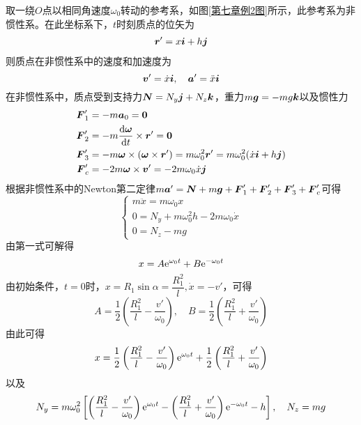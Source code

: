 \begin{solution}
取一绕$O$点以相同角速度$\omega_0$转动的参考系，如图\ref{第七章例2图}所示，此参考系为非惯性系。在此坐标系下，$t$时刻质点的位矢为
\begin{align*}
	\boldsymbol{r}' = x\boldsymbol{i}+h\boldsymbol{j}
\end{align*}
则质点在非惯性系中的速度和加速度为
\begin{equation*}
	\boldsymbol{v}' = \dot{x}\boldsymbol{i},\quad \boldsymbol{a}' = \ddot{x}\boldsymbol{i}
\end{equation*}
在非惯性系中，质点受到支持力$\boldsymbol{N} = N_y\boldsymbol{j}+N_z\boldsymbol{k}$，重力$m\boldsymbol{g}=-mg\boldsymbol{k}$以及惯性力
\begin{align*}
	\boldsymbol{F}'_1 & = -m\boldsymbol{a}_0 = \boldsymbol{0} \\
	\boldsymbol{F}'_2 & = -m\frac{\mathrm{d}\boldsymbol{\omega}}{\mathrm{d} t} \times \boldsymbol{r}' = \boldsymbol{0} \\
	\boldsymbol{F}'_3 & = -m\boldsymbol{\omega} \times (\boldsymbol{\omega} \times \boldsymbol{r}') = m\omega_0^2\boldsymbol{r}' = m\omega_0^2(\dot{x}\boldsymbol{i}+h\boldsymbol{j}) \\
	\boldsymbol{F}'_c & = -2m\boldsymbol{\omega} \times \boldsymbol{v}' = -2m\omega_0\dot{x}\boldsymbol{j}
\end{align*}
根据非惯性系中的Newton第二定律$m\boldsymbol{a}'=\boldsymbol{N}+m\boldsymbol{g}+\boldsymbol{F}'_1+\boldsymbol{F}'_2+\boldsymbol{F}'_3+\boldsymbol{F}'_c$可得
\begin{equation*}
\begin{cases}
	m\ddot{x} = m\omega_0x \\
	0 = N_y+m\omega_0^2h-2m\omega_0\dot{x} \\
	0 = N_z-mg
\end{cases}
\end{equation*}
由第一式可解得
\begin{equation*}
	x = A\mathrm{e}^{\omega_0t}+B\mathrm{e}^{-\omega_0t}
\end{equation*}
由初始条件，$t=0$时，$x=R_1\sin\alpha=\dfrac{R_1^2}{l}, \dot{x}=-v'$，可得
\begin{equation*}
	A = \frac12 \left(\frac{R_1^2}{l} - \frac{v'}{\omega_0}\right),\quad B = \frac12 \left(\frac{R_1^2}{l} + \frac{v'}{\omega_0}\right)
\end{equation*}
由此可得
\begin{equation*}
	x = \frac12 \left(\frac{R_1^2}{l} - \frac{v'}{\omega_0}\right)\mathrm{e}^{\omega_0t}+\frac12 \left(\frac{R_1^2}{l} + \frac{v'}{\omega_0}\right)
\end{equation*}
以及
\begin{equation*}
	N_y = m\omega_0^2\left[\left(\frac{R_1^2}{l} - \frac{v'}{\omega_0}\right)\mathrm{e}^{\omega_0t}-\left(\frac{R_1^2}{l} + \frac{v'}{\omega_0}\right)\mathrm{e}^{-\omega_0t}-h\right],\quad N_z=mg
\end{equation*}


\end{solution}
